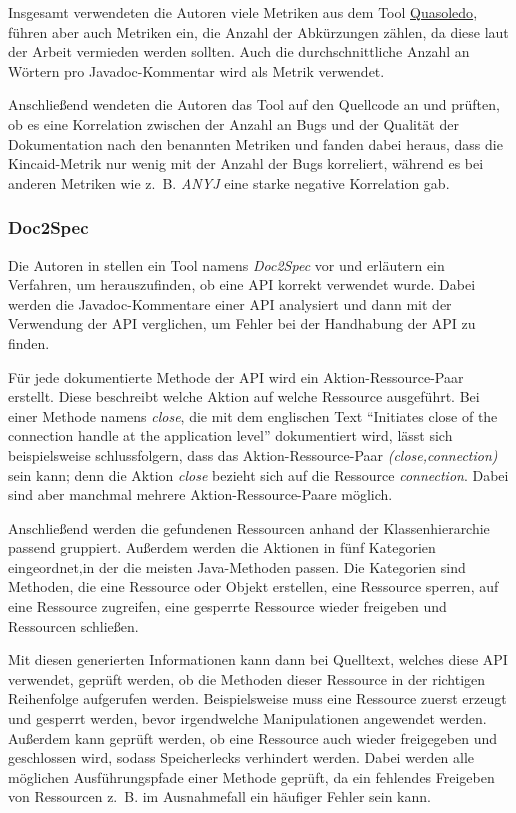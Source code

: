 Insgesamt verwendeten die Autoren viele Metriken aus dem Tool \hyperref[chapter:Quasoledo]{Quasoledo}, führen aber auch Metriken ein, die Anzahl der Abkürzungen zählen, da diese laut der Arbeit vermieden werden sollten. Auch die durchschnittliche Anzahl an Wörtern pro Javadoc-Kommentar wird als Metrik verwendet. 

Anschließend wendeten die Autoren das Tool auf den Quellcode an und prüften, ob es eine Korrelation zwischen der Anzahl an Bugs und der Qualität der Dokumentation nach den benannten Metriken und fanden dabei heraus, dass die Kincaid-Metrik nur wenig mit der Anzahl der Bugs korreliert, während es bei anderen Metriken wie z.~B. \textit{ANYJ} eine starke negative Korrelation gab. 

\subsubsection{Doc2Spec}
Die Autoren in \cite[S. 307ff.]{InferringResourceSpecificationsfromNaturalLanguageAPIDocumentation} stellen ein Tool namens \textit{Doc2Spec} vor und erläutern ein Verfahren, um herauszufinden, ob eine API korrekt verwendet wurde. Dabei werden die Javadoc-Kommentare einer API analysiert und dann mit der Verwendung der API verglichen, um Fehler bei der Handhabung der API zu finden. 

Für jede dokumentierte Methode der API wird ein Aktion-Ressource-Paar erstellt. Diese beschreibt welche Aktion auf welche Ressource ausgeführt. Bei einer Methode namens \textit{close}, die mit dem englischen Text \enquote{Initiates close of the connection handle at the
application level} dokumentiert wird, lässt sich beispielsweise schlussfolgern, dass das Aktion-Ressource-Paar \textit{(close,connection)} sein kann; denn die Aktion \textit{close} bezieht sich auf die Ressource \textit{connection}. Dabei sind aber manchmal mehrere Aktion-Ressource-Paare möglich\cite[S. 308]{InferringResourceSpecificationsfromNaturalLanguageAPIDocumentation}.

Anschließend werden die gefundenen Ressourcen anhand der Klassenhierarchie passend gruppiert. Außerdem werden die Aktionen in fünf Kategorien eingeordnet,in der die meisten Java-Methoden passen. Die Kategorien sind Methoden, die eine Ressource oder Objekt erstellen, eine Ressource sperren, auf eine Ressource zugreifen, eine gesperrte Ressource wieder freigeben und Ressourcen schließen. 

Mit diesen generierten Informationen kann dann bei Quelltext, welches diese API verwendet, geprüft werden, ob die Methoden dieser Ressource in der richtigen Reihenfolge aufgerufen werden. Beispielsweise muss eine Ressource zuerst erzeugt und gesperrt werden, bevor irgendwelche Manipulationen angewendet werden. Außerdem kann geprüft werden, ob eine Ressource auch wieder freigegeben und geschlossen wird, sodass Speicherlecks verhindert werden. Dabei werden alle möglichen Ausführungspfade einer Methode geprüft, da ein fehlendes Freigeben von Ressourcen z.~B. im Ausnahmefall ein häufiger Fehler sein kann. 

